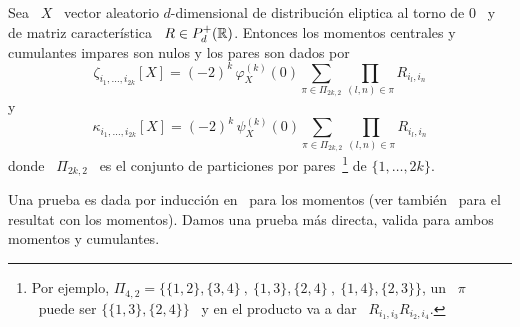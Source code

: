 \begin{teorema}
  Sea \  $X$ \  vector aleatorio $d$-dimensional  de distribuci\'on  eliptica al
  torno de $0$  \ y de matriz caracter\'istica \  $R \in P_d^+(\mathbb{R})$. Entonces
  los momentos  centrales y cumulantes impares  son nulos y los  pares son dados
  por
  \[
  \zeta_{i_1,\ldots,i_{2  k}}[X] =  (-2)^k \,  \varphi_X^{(k)}(0)  \sum_{\pi \in
    \Pi_{2 k , 2}} \prod_{(l,n) \in \pi} R_{i_l,i_n}
  \]
  y
  \[
  \kappa_{i_1,\ldots,i_{2  k}}[X]  =  (-2)^k  \, \psi_X^{(k)}(0)  \sum_{\pi  \in
    \Pi_{2 k , 2}} \prod_{(l,n) \in \pi} R_{i_l,i_n}
  \]
  donde   \  $\Pi_{2   k  ,   2}$   \  es   el  conjunto   de  particiones   por
  pares~\footnote{Por ejemplo,  $\Pi_{4,2} =  \big\{ \{1,2\} ,  \{3,4\} \:  , \:
    \{1,3\} , \{2,4\} \: , \: \{1,4\}  , \{2,3\} \big\}$, un \ $\pi$ \ puede ser
    $\big\{ \{1,3\} , \{2,4\} \big\}$ \ y en el producto va a dar \ $R_{i_1,i_3}
    R_{i_2,i_4}$.} de $\{ 1 , \ldots , 2 k \}$.
\end{teorema}
%
Una  prueba es  dada por  inducci\'on en~\cite{BerBen86}  para los  momentos (ver
tambi\'en~\cite[p.~44]{FanKot90} para  el resultat con los  momentos). Damos una
prueba m\'as directa, valida para ambos momentos y cumulantes.
%
